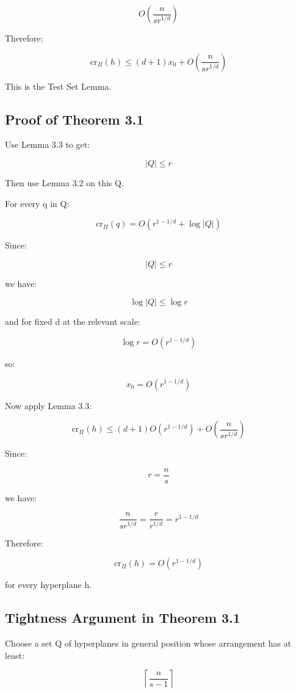 \documentclass[
  11pt,
]{article}
\begin{document}
\[
O\left(\frac{n}{s r^{1/d}}\right)
\]

Therefore:

\[
\mathrm{cr}_\Pi(h) \le (d+1)x_0 + O\left(\frac{n}{s r^{1/d}}\right)
\]

This is the Test Set Lemma.

\hypertarget{proof-of-theorem-3.1}{%
\subsection{Proof of Theorem 3.1}\label{proof-of-theorem-3.1}}

Use Lemma 3.3 to get:

\[
|Q|\le r
\]

Then use Lemma 3.2 on this Q.

For every q in Q:

\[
\mathrm{cr}_\Pi(q) = O(r^{1-1/d}+\log |Q|)
\]

Since:

\[
|Q|\le r
\]

we have:

\[
\log |Q|\le \log r
\]

and for fixed d at the relevant scale:

\[
\log r=O(r^{1-1/d})
\]

so:

\[
x_0=O(r^{1-1/d})
\]

Now apply Lemma 3.3:

\[
\mathrm{cr}_\Pi(h) \le (d+1)O(r^{1-1/d}) + O\left(\frac{n}{s r^{1/d}}\right)
\]

Since:

\[
r=\frac{n}{s}
\]

we have:

\[
\frac{n}{s r^{1/d}} = \frac{r}{r^{1/d}} = r^{1-1/d}
\]

Therefore:

\[
\mathrm{cr}_\Pi(h) = O(r^{1-1/d})
\]

for every hyperplane h.

\hypertarget{tightness-argument-in-theorem-3.1}{%
\subsection{Tightness Argument in Theorem
3.1}\label{tightness-argument-in-theorem-3.1}}

Choose a set Q of hyperplanes in general position whose arrangement has
at least:

\[
\left\lceil\frac{n}{s-1}\right\rceil
\]
\end{document}
